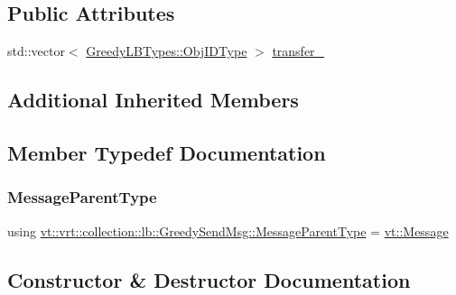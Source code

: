 \subsection*{Public Attributes}
\begin{DoxyCompactItemize}
\item 
std\+::vector$<$ \hyperlink{structvt_1_1vrt_1_1collection_1_1lb_1_1_greedy_l_b_types_ae22670acd689e4ff83315fac2e4acb5e}{Greedy\+L\+B\+Types\+::\+Obj\+I\+D\+Type} $>$ \hyperlink{structvt_1_1vrt_1_1collection_1_1lb_1_1_greedy_send_msg_a364f37ecbcc82207e7b1ff3817d82848}{transfer\+\_\+}
\end{DoxyCompactItemize}
\subsection*{Additional Inherited Members}


\subsection{Member Typedef Documentation}
\mbox{\label{structvt_1_1vrt_1_1collection_1_1lb_1_1_greedy_send_msg_a91c78d20e334e20ba9bcc8f969d48e51}} 
\subsubsection{\texorpdfstring{Message\+Parent\+Type}{MessageParentType}}
{\footnotesize\ttfamily using \hyperlink{structvt_1_1vrt_1_1collection_1_1lb_1_1_greedy_send_msg_a91c78d20e334e20ba9bcc8f969d48e51}{vt\+::vrt\+::collection\+::lb\+::\+Greedy\+Send\+Msg\+::\+Message\+Parent\+Type} =  \hyperlink{namespacevt_a3a3ddfef40b4c90915fa43cdd5f129ea}{vt\+::\+Message}}



\subsection{Constructor \& Destructor Documentation}
\mbox{\label{structvt_1_1vrt_1_1collection_1_1lb_1_1_greedy_send_msg_a7fdf684e6c431b3b7a412a137d2fc404}} 
